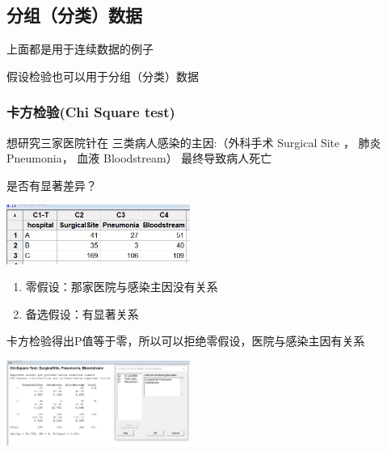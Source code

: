 
\hypertarget{ux65b9ux5deeux5206ux67901-anova-test}{%
\subsection{分组（分类）数据}\label{ux65b9ux5deeux5206ux67901-anova-test}}

上面都是用于连续数据的例子

假设检验也可以用于分组（分类）数据

\hypertarget{ux5361ux65b9ux68c0ux9a8cchi-square-test}{%
\subsubsection{卡方检验(Chi Square
test)}\label{ux5361ux65b9ux68c0ux9a8cchi-square-test}}

想研究三家医院针在 三类病人感染的主因:（外科手术 Surgical Site ， 肺炎
Pneumonia， 血液 Bloodstream） 最终导致病人死亡

是否有显著差异？


\includegraphics[width=6cm]{4chiSquareDataScreenshot_2022-07-24_110053.jpg}

\begin{enumerate}
\tightlist
\item
  零假设：那家医院与感染主因没有关系
\item
  备选假设：有显著关系
\end{enumerate}

卡方检验得出P值等于零，所以可以拒绝零假设，医院与感染主因有关系


\includegraphics[width=6cm]{6chiSquareTstResultScreenshot_2022-07-24_103606.jpg}

